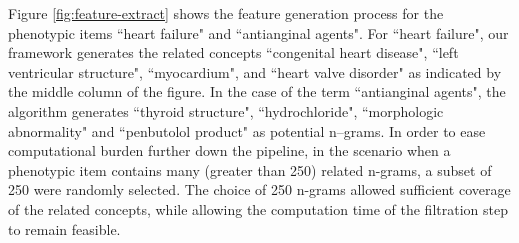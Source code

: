 \documentclass{sig-alternate-05-2015}
\newcommand{\kibitz}[2]{\ifnum\Comments=1\textcolor{#1}{#2}\fi}
\newcommand{\joyce}[1]{\kibitz{purple}      {[Joyce: #1]}}
\newcommand{\jette}[1]{\kibitz{red}      {[Jette: #1]}}
\begin{document}
Figure \ref{fig:feature-extract} shows the feature generation process for the phenotypic items ``heart failure" and ``antianginal agents".
For ``heart failure", our framework generates the related concepts ``congenital heart disease", ``left ventricular structure", ``myocardium", and ``heart valve disorder" as indicated by the middle column of the figure.
In the case of the term ``antianginal agents", the algorithm generates ``thyroid structure", ``hydrochloride", ``morphologic abnormality" and ``penbutolol product" as potential n--grams.
In order to ease computational burden further down the pipeline, in the scenario when a phenotypic item contains many (greater than 250) related n-grams, a subset of 250 were randomly selected.
The choice of 250 n-grams allowed sufficient coverage of the related concepts, while allowing the computation time of the filtration step to remain feasible.


\end{document}
